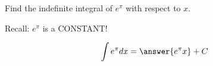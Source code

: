 \documentclass{ximera}
\author{Gregory Hartman \and Matthew Carr\and Nela Lakos}
\begin{document}
\begin{exercise}


Find the indefinite integral of $e^{\pi}$ with respect to $x$.
\begin{hint}
Recall: $e^{\pi}$ is a CONSTANT!
\end{hint}
\[
\int e^{\pi} dx=\answer{e^{\pi} x}+C
\]


\end{exercise}
\end{document}
